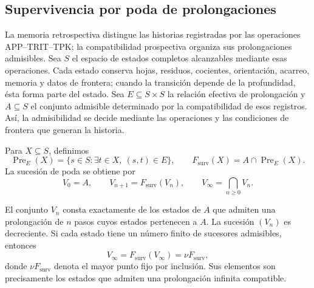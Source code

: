 \subsection{Supervivencia por poda de prolongaciones}
\label{corpus9:xi:supervivencia}

La memoria retrospectiva distingue las historias registradas por las
operaciones APP--TRIT--TPK; la compatibilidad prospectiva organiza sus
prolongaciones admisibles. Sea \(S\) el espacio de estados completos
alcanzables mediante esas operaciones. Cada estado conserva hojas, residuos,
cocientes, orientación, acarreo, memoria y datos de frontera; cuando la
transición depende de la profundidad, ésta forma parte del estado.
Sea \(E\subseteq S\times S\) la relación efectiva de prolongación y
\(A\subseteq S\) el conjunto admisible determinado por la compatibilidad de
esos registros. Así, la admisibilidad se decide mediante las operaciones y
las condiciones de frontera que generan la historia.

Para \(X\subseteq S\), definimos
\begin{equation}
 \operatorname{Pre}_{E}(X)
 =\{s\in S:\exists t\in X,\ (s,t)\in E\},
 \qquad
 F_{\mathrm{surv}}(X)=A\cap\operatorname{Pre}_{E}(X).
 \label{corpus9:xi:operador-poda}
\end{equation}
La sucesión de poda se obtiene por
\begin{equation}
 V_0=A,\qquad
 V_{n+1}=F_{\mathrm{surv}}(V_n),\qquad
 V_\infty=\bigcap_{n\geq0}V_n.
 \label{corpus9:xi:sucesion-poda}
\end{equation}

\begin{proposition}
\label{corpus9:xi:mayor-punto-fijo}
El conjunto \(V_n\) consta exactamente de los estados de \(A\) que admiten
una prolongación de \(n\) pasos cuyos estados pertenecen a \(A\). La
sucesión \((V_n)\) es decreciente. Si cada estado tiene un número finito
de sucesores admisibles, entonces
\[
 V_\infty=F_{\mathrm{surv}}(V_\infty)
          =\nu F_{\mathrm{surv}},
\]
donde \(\nu F_{\mathrm{surv}}\) denota el mayor punto fijo por inclusión.
Sus elementos son precisamente los estados que admiten una prolongación
infinita compatible.
\end{proposition}

